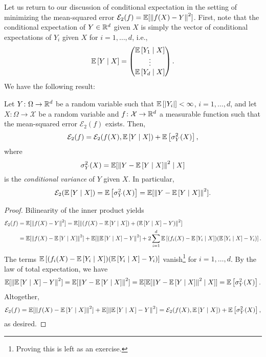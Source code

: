 Let us return to our discussion of conditional expectation in the setting of minimizing the mean-squared error $\mathcal{E}_2(f) = \mathbb{E}[\norm{f(X) - Y}^2]$. First, note that the conditional expectation of $Y \in \mathbb{R}^d$ given $X$ is simply the vector of conditional expectations of $Y_i$ given $X$ for $i = 1, \dots, d$, i.e.,
\[
    \mathbb{E}\left[Y \mathrel{|} X\right] = \begin{pmatrix}
        \mathbb{E}\left[Y_1 \mathrel{|} X\right] \\
        \vdots \\
        \mathbb{E}\left[Y_d \mathrel{|} X\right]
    \end{pmatrix}.
\]
We have the following result:
\begin{proposition}
\label{prop: decomposition of mean-squared error}
Let $Y \colon \Omega \to \mathbb{R}^d$ be a random variable such that $\mathbb{E}\left[\abs{Y_i}\right] < \infty$, $i = 1, \dots, d$, and let $X \colon \Omega \to \mathcal{X}$ be a random variable and $f \colon \mathcal{X} \to \mathbb{R}^d$ a measurable function such that the mean-squared error $\mathcal{E}_2(f)$ exists. Then,
\[
    \mathcal{E}_2(f) = \mathcal{E}_2(f(X), \mathbb{E}\left[Y \mathrel{|} X\right]) + \mathbb{E}\left[\sigma_Y^2(X)\right],
\]
where
\[
    \sigma_Y^2(X) = \mathbb{E}[\norm{Y - \mathbb{E}\left[Y \mathrel{|} X\right]}^2 \mathrel{|} X]
\]
is the \emph{conditional variance} of $Y$ given $X$. In particular,
\[
    \mathcal{E}_2(\mathbb{E}\left[Y \mathrel{|} X\right]) = \mathbb{E}\left[\sigma_Y^2(X)\right] = \mathbb{E}[\norm{Y - \mathbb{E}\left[Y \mathrel{|} X\right]}^2].
\]
\end{proposition}

\begin{proof}
Bilinearity of the inner product yields
\begin{align*}
    \mathcal{E}_2(f) &= \mathbb{E}[\norm{f(X) - Y}^2] = \mathbb{E}[\norm{(f(X) - \mathbb{E}\left[Y \mathrel{|} X\right]) + (\mathbb{E}\left[Y \mathrel{|} X\right] - Y)}^2] \\
        &= \mathbb{E}[\norm{f(X) - \mathbb{E}\left[Y \mathrel{|} X\right]}^2] + \mathbb{E}[\norm{\mathbb{E}\left[Y \mathrel{|} X\right] - Y}^2] + 2 \sum_{i=1}^d \mathbb{E}\left[(f_i(X) - \mathbb{E}\left[Y_i \mathrel{|} X\right]) (\mathbb{E}\left[Y_i \mathrel{|} X\right] - Y_i)\right].
\end{align*}
The terms $\mathbb{E}\left[(f_i(X) - \mathbb{E}\left[Y_i \mathrel{|} X\right]) (\mathbb{E}\left[Y_i \mathrel{|} X\right] - Y_i)\right]$ vanish\footnote{Proving this is left as an exercise.} for $i = 1, \dots, d$. By the law of total expectation, we have
\[
    \mathbb{E}[\norm{\mathbb{E}\left[Y \mathrel{|} X\right] - Y}^2] = \mathbb{E}[\norm{Y - \mathbb{E}\left[Y \mathrel{|} X\right]}^2] = \mathbb{E}[\mathbb{E}[\norm{Y - \mathbb{E}\left[Y \mathrel{|} X\right]}^2 \mathrel{|} X]] = \mathbb{E}\left[\sigma_Y^2(X)\right].
\]
Altogether,
\[
    \mathcal{E}_2(f) = \mathbb{E}[\norm{f(X) - \mathbb{E}\left[Y \mathrel{|} X\right]}^2] + \mathbb{E}[\norm{\mathbb{E}\left[Y \mathrel{|} X\right] - Y}^2] = \mathcal{E}_2(f(X), \mathbb{E}\left[Y \mathrel{|} X\right]) + \mathbb{E}\left[\sigma_Y^2(X)\right],
\]
as desired.
\end{proof}

